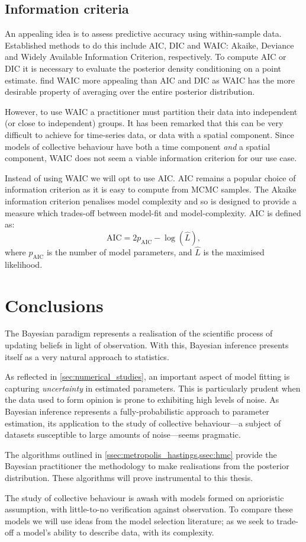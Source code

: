 \subsection{Information criteria}

An appealing idea is to assess predictive accuracy using within-sample data.
Established methods to do this include AIC, DIC and WAIC: Akaike, Deviance and
Widely Available Information Criterion, respectively. To compute AIC or DIC it
is necessary to evaluate the posterior density conditioning on a point
estimate. \textcite{gelman13} find WAIC more appealing than AIC and DIC as
WAIC has the more desirable property of averaging over the entire posterior
distribution.

However, to use WAIC a practitioner must partition their data into independent
(or close to independent) groups. It has been remarked that this can be very
difficult to achieve for time-series data, or data with a spatial component.
Since models of collective behaviour have both a time component \emph{and} a
spatial component, WAIC does not seem a viable information criterion for our
use case.

Instead of using WAIC we will opt to use AIC. AIC remains a popular choice of
information criterion as it is easy to compute from MCMC samples. The Akaike
information criterion penalises model complexity and so is designed to provide
a measure which trades-off between model-fit and model-complexity. AIC is
defined as:
\begin{equation}
\label{eq:aic}
\text{AIC} = 2p_{\text{AIC}} - \log(\widehat{L}),
\end{equation}
where $p_{\text{AIC}}$ is the number of model parameters, and $\widehat{L}$ is
the maximised likelihood.

\section*{Conclusions}

The Bayesian paradigm represents a realisation of the scientific process of
updating beliefs in light of observation. With this, Bayesian inference
presents itself as a very natural approach to statistics.

As reflected in \cref{sec:numerical_studies}, an important aspect of model
fitting is capturing \emph{uncertainty} in estimated parameters. This is
particularly prudent when the data used to form opinion is prone to exhibiting
high levels of noise. As Bayesian inference represents a fully-probabilistic
approach to parameter estimation, its application to the study of collective
behaviour---a subject of datasets susceptible to large amounts of noise---seems
pragmatic.

The algorithms outlined in \cref{ssec:metropolis_hastings,ssec:hmc} provide the
Bayesian practitioner the methodology to make realisations from the posterior
distribution. These algorithms will prove instrumental to this thesis.

The study of collective behaviour is awash with models formed on aprioristic
assumption, with little-to-no verification against observation. To compare
these models we will use ideas from the model selection literature; as we seek
to trade-off a model's ability to describe data, with its complexity.
